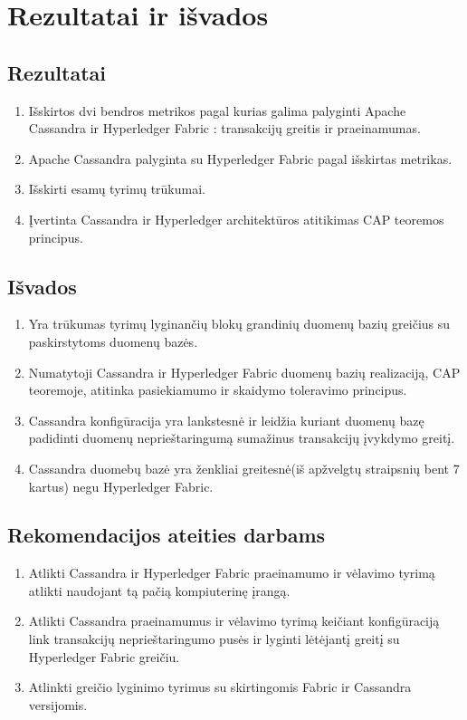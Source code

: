 \documentclass{VUMIFPSkursinis}
\begin{document}
\pagebreak
\section{Rezultatai ir išvados}
\thispagestyle{empty} 
\subsection{Rezultatai}
\begin{enumerate}
\item{Išskirtos dvi bendros metrikos pagal kurias galima palyginti Apache Cassandra ir Hyperledger Fabric : transakcijų greitis ir praeinamumas.}
\item{Apache Cassandra palyginta su Hyperledger Fabric pagal išskirtas metrikas.}
\item{Išskirti esamų tyrimų trūkumai.}
\item{Įvertinta Cassandra ir Hyperledger architektūros atitikimas CAP teoremos principus.}
\end{enumerate}
\subsection{Išvados}
\begin{enumerate}
\item{Yra trūkumas tyrimų lyginančių blokų grandinių duomenų bazių greičius su paskirstytoms duomenų bazės.}
\item{Numatytoji Cassandra ir Hyperledger Fabric duomenų bazių realizaciją, CAP teoremoje, atitinka pasiekiamumo ir skaidymo toleravimo principus.}
\item{Cassandra konfigūracija yra lankstesnė ir leidžia kuriant duomenų bazę padidinti duomenų neprieštaringumą sumažinus transakcijų įvykdymo greitį.}
\item{Cassandra duomebų bazė yra ženkliai greitesnė(iš apžvelgtų straipsnių bent 7 kartus) negu Hyperledger Fabric.}
\end{enumerate}
\subsection{Rekomendacijos ateities darbams}
\begin{enumerate}
\item{Atlikti Cassandra ir Hyperledger Fabric praeinamumo ir vėlavimo tyrimą atlikti naudojant tą pačią kompiuterinę įrangą.}
\item{Atlikti Cassandra praeinamumus ir vėlavimo tyrimą keičiant konfigūraciją link transakcijų neprieštaringumo pusės ir lyginti lėtėjantį greitį su Hyperledger Fabric greičiu.}
\item{Atlinkti greičio lyginimo tyrimus su skirtingomis Fabric ir Cassandra versijomis.}
\end{enumerate}
\end{document}
